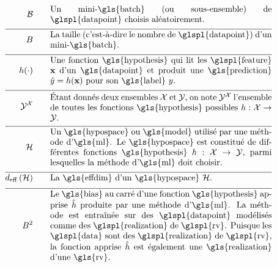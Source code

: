 \begin{align}
	\batch \quad\quad &\parbox{.75\textwidth}{Un mini-\gls{batch} (ou sous-ensemble) de \glspl{datapoint} choisis aléatoirement.}\nonumber \\[2mm] \hline \nonumber\\[-5mm]
	\batchsize \quad\quad &\parbox{.75\textwidth}{La taille (c’est-à-dire le nombre de \glspl{datapoint}) d’un mini-\gls{batch}.}\nonumber \\[2mm] \hline \nonumber\\[-5mm]
	\hypothesis(\cdot)  \quad\quad &\parbox{.75\textwidth}{Une fonction \gls{hypothesis} qui lit les \glspl{feature} $\featurevec$ d’un \gls{datapoint} et produit une \gls{prediction} $\hat{\truelabel}=\hypothesis(\featurevec)$ pour son \gls{label} $\truelabel$.}  	 \nonumber \\[2mm] \hline \nonumber\\[-5mm]
	\labelspace^{\featurespace} \quad\quad & \parbox{.75\textwidth}{Étant donnés deux ensembles $\featurespace$ et $\labelspace$, on note $\labelspace^{\featurespace}$ l’ensemble de toutes les fonctions \gls{hypothesis} possibles $\hypothesis: \featurespace \rightarrow \labelspace$.}  	 \nonumber \\[2mm] \hline \nonumber\\[-5mm]
	\hypospace  \quad\quad & \parbox{.75\textwidth}{Un \gls{hypospace} ou \gls{model} utilisé par une méthode d’\gls{ml}. Le \gls{hypospace} est constitué de différentes fonctions \gls{hypothesis} $\hypothesis: \featurespace \rightarrow \labelspace$, parmi lesquelles la méthode d’\gls{ml} doit choisir.}   \nonumber \\[2mm] \hline \nonumber\\[-5mm]
	\effdim{\hypospace}  \quad\quad & \parbox{.75\textwidth}{La \gls{effdim} d’un \gls{hypospace} $\hypospace$.}   \nonumber \\[2mm] \hline \nonumber\\[-5mm]
	\biasterm^2 \quad\quad &\parbox{.75\textwidth}{
		Le \gls{bias} au carré d’une fonction \gls{hypothesis} apprise $\learnthypothesis$ produite par une méthode d’\gls{ml}. La méthode est entraînée sur des \glspl{datapoint} modélisés comme des \glspl{realization} de \glspl{rv}. Puisque les \glspl{data} sont des \glspl{realization} de \glspl{rv}, la fonction apprise $\learnthypothesis$ est également une \gls{realization} d’une \gls{rv}.} \nonumber                             
\end{align}

